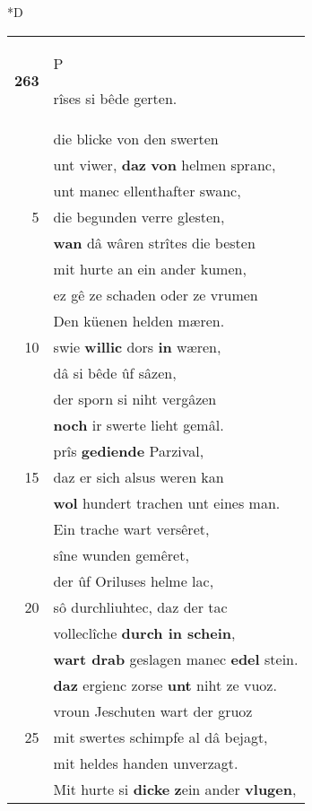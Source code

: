 \documentclass[8pt,a4paper,notitlepage]{article}
\begin{document}
\begin{table}[ht]
\begin{minipage}[t]{0.5\linewidth}
\small
\begin{center}*D
\end{center}
\begin{tabular}{rl}
\textbf{263} & \begin{large}P\end{large}rîses si bêde gerten.\\ 
 & die blicke von den swerten\\ 
 & unt viwer, \textbf{daz} \textbf{von} helmen spranc,\\ 
 & unt manec ellenthafter swanc,\\ 
5 & die begunden verre glesten,\\ 
 & \textbf{wan} dâ wâren strîtes die besten\\ 
 & mit hurte an ein ander kumen,\\ 
 & ez gê ze schaden oder ze vrumen\\ 
 & Den küenen helden mæren.\\ 
10 & swie \textbf{willic} dors \textbf{in} wæren,\\ 
 & dâ si bêde ûf sâzen,\\ 
 & der sporn si niht vergâzen\\ 
 & \textbf{noch} ir swerte lieht gemâl.\\ 
 & prîs \textbf{gediende} Parzival,\\ 
15 & daz er sich alsus weren kan\\ 
 & \textbf{wol} hundert trachen unt eines man.\\ 
 & Ein trache wart versêret,\\ 
 & sîne wunden gemêret,\\ 
 & der ûf Oriluses helme lac,\\ 
20 & sô durchliuhtec, daz der tac\\ 
 & volleclîche \textbf{durch in schein},\\ 
 & \textbf{wart drab} geslagen manec \textbf{edel} stein.\\ 
 & \textbf{daz} ergienc zorse \textbf{unt} niht ze vuoz.\\ 
 & vroun Jeschuten wart der gruoz\\ 
25 & mit swertes schimpfe al dâ bejagt,\\ 
 & mit heldes handen unverzagt.\\ 
 & Mit hurte si \textbf{dicke} \textbf{z}ein ander \textbf{vlugen},\\ 

\end{tabular}
\end{minipage}
\end{table}
\end{document}
